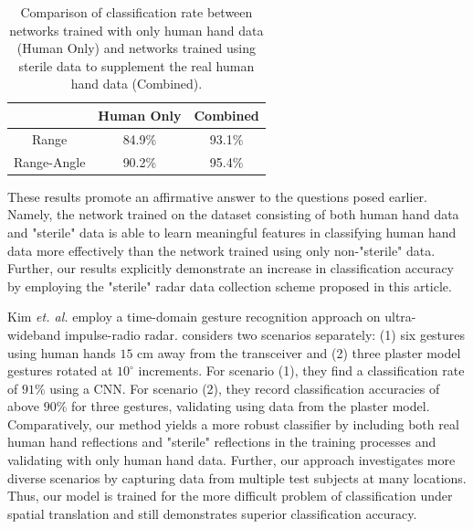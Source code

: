 \documentclass{ieeeaccess}
\begin{document}
\begin{table}[h]
    \centering
    \large
    \begin{tabular}{c|c c}
         & Human Only & Combined \\
         \hline
         Range & 84.9\% & 93.1\% \\
         Range-Angle & 90.2\% & 95.4\%
    \end{tabular}
    \caption{Comparison of classification rate between networks trained with only human hand data (Human Only) and networks trained using sterile data to supplement the real human hand data (Combined).}
    \label{tab:results}
\end{table}

These results promote an affirmative answer to the questions posed earlier. Namely, the network trained on the dataset consisting of both human hand data and "sterile" data is able to learn meaningful features in classifying human hand data more effectively than the network trained using only non-"sterile" data. Further, our results explicitly demonstrate an increase in classification accuracy by employing the "sterile" radar data collection scheme proposed in this article. 

Kim \textit{et. al.} \cite{static_gesture_recognition:time_domain} employ a time-domain gesture recognition approach on ultra-wideband impulse-radio radar. \cite{static_gesture_recognition:time_domain} considers two scenarios separately: (1) six gestures using human hands $15$ cm away from the transceiver and (2) three plaster model gestures rotated at $10^\circ$ increments. For scenario (1), they find a classification rate of $91\%$ using a CNN. For scenario (2), they record classification accuracies of above $90\%$ for three gestures, validating using data from the plaster model. Comparatively, our method yields a more robust classifier by including both real human hand reflections and "sterile" reflections in the training processes and validating with only human hand data. Further, our approach investigates more diverse scenarios by capturing data from multiple test subjects at many locations. Thus, our model is trained for the more difficult problem of classification under spatial translation and still demonstrates superior classification accuracy.
\end{document}
